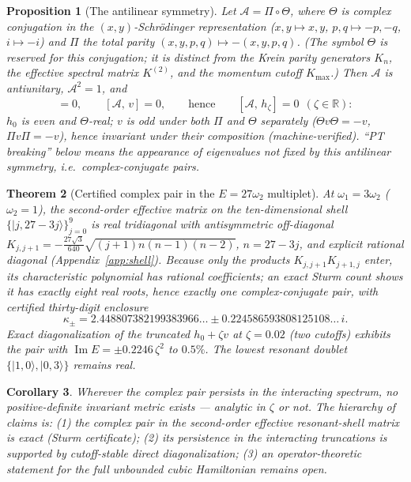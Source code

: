\documentclass[11pt]{article}
\newtheorem{theorem}{Theorem}[section]
\newtheorem{proposition}[theorem]{Proposition}
\newtheorem{corollary}[theorem]{Corollary}
\theoremstyle{definition}
\theoremstyle{remark}
\newcommand{\R}{\mathbb{R}}
\newcommand{\w}{\omega}
\begin{document}
\begin{proposition}[The antilinear symmetry]\label{prop:pt}
Let $\mathcal A=\Pi\circ\Theta$, where $\Theta$ is complex conjugation
in the $(x,y)$-Schr\"odinger representation ($x,y\mapsto x,y$,
$p,q\mapsto-p,-q$, $i\mapsto-i$) and $\Pi$ the total parity
$(x,y,p,q)\mapsto-(x,y,p,q)$.  (The symbol $\Theta$ is reserved for
this conjugation; it is distinct from the Krein parity generators
$K_n$, the effective spectral matrix $K^{(2)}$, and the momentum cutoff
$K_{\max}$.)  Then $\mathcal A$ is antiunitary, $\mathcal A^2=1$, and
\begin{equation}
[\mathcal A,\,h_0]=0,\qquad [\mathcal A,\,v]=0,
\qquad\text{hence}\qquad [\mathcal A,\,h_\zeta]=0
\ \ (\zeta\in\R):
\end{equation}
$h_0$ is even and $\Theta$-real; $v$ is odd under both $\Pi$ and
$\Theta$ separately ($\Theta v\Theta=-v$, $\Pi v\Pi=-v$), hence
invariant under their composition (machine-verified).  ``PT breaking''
below means the appearance of eigenvalues not fixed by this antilinear
symmetry, i.e.\ complex-conjugate pairs.
\end{proposition}

\begin{theorem}[Certified complex pair in the $E=27\w_2$ multiplet]
\label{thm:complexpair}
At $\w_1=3\w_2$ ($\w_2=1$), the second-order effective matrix on the
ten-dimensional shell $\{|j,27-3j\rangle\}_{j=0}^9$ is real tridiagonal
with antisymmetric off-diagonal
$K_{j,j+1}=-\tfrac{27\sqrt3}{640}\sqrt{(j{+}1)n(n{-}1)(n{-}2)}$,
$n=27-3j$, and explicit rational diagonal (Appendix~\ref{app:shell}).
Because only the products $K_{j,j+1}K_{j+1,j}$ enter, its
characteristic polynomial has \emph{rational} coefficients; an exact
Sturm count shows it has exactly eight real roots, hence exactly one
complex-conjugate pair, with certified thirty-digit enclosure
\begin{equation}
\kappa_\pm=2.448807382199383966\ldots\pm
0.224586593808125108\ldots\,i .
\end{equation}
Exact diagonalization of the truncated $h_0+\zeta v$ at $\zeta=0.02$
(two cutoffs) exhibits the pair with
$\operatorname{Im}E=\pm0.2246\,\zeta^2$ to $0.5\%$.  The lowest
resonant doublet $\{|1,0\rangle,|0,3\rangle\}$ remains real.
\end{theorem}

\begin{corollary}
Wherever the complex pair persists in the interacting spectrum, no
positive-definite invariant metric exists --- analytic in $\zeta$ or
not.  The hierarchy of claims is: (1) the complex pair in the
second-order effective resonant-shell matrix is \emph{exact} (Sturm
certificate); (2) its persistence in the interacting truncations is
supported by cutoff-stable direct diagonalization; (3) an
operator-theoretic statement for the full unbounded cubic Hamiltonian
remains open.
\end{corollary}
\end{document}
